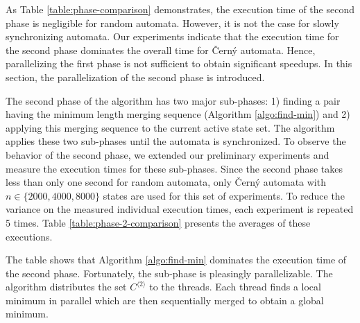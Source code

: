 As Table \ref{table:phase-comparison} demonstrates, the execution time of the second phase is negligible for random automata. However, it is not the case for slowly synchronizing automata. Our experiments indicate that the execution time for the second phase dominates the overall time for \v{C}ern\'y automata. Hence, parallelizing the first phase is not sufficient to obtain significant speedups. In this section, the parallelization of the second phase is introduced.

The second phase of the algorithm has two major sub-phases: 1) finding a pair having the minimum length merging sequence (Algorithm \ref{algo:find-min}) and 2) applying this merging sequence to the current active state set. The algorithm applies these two sub-phases until the automata is synchronized. To observe the behavior of the second phase, we extended our preliminary experiments and measure the execution times for these sub-phases. Since the second phase takes less than only one second for random automata, only \v{C}ern\'y automata with $n \in \{2000, 4000, 8000\}$ states are used for this set of experiments. To reduce the variance on the measured individual execution times, each experiment is repeated 5 times. Table \ref{table:phase-2-comparison} presents the averages of these executions.


\begin{table}[ht]
	\center
	\caption{Comparison of the run time of Algorithm \ref{algo:find-min} ($t_{FIND\_MIN}$), i.e., the first sub-phase, and the second phase ($t_{SECOND\_PHASE}$).}
	\label{table:phase-2-comparison}
\end{table}

The table shows that Algorithm \ref{algo:find-min} dominates the execution time of the second phase. Fortunately, the sub-phase is pleasingly parallelizable. The algorithm distributes the set $C^{\langle 2 \rangle}$ to the threads. Each thread finds a local minimum in parallel which are then sequentially merged to obtain a global minimum.

